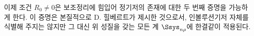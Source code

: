 
이제 조건 $R_0\ne0$은 보조정리에 힘입어 정기저의 존재에 대한 두 번째 증명을 가능하게 한다. 이 증명은 본질적으로 D. 힐베르트가 제시한 것으로서, 인볼루션기저 자체를 식별해 주지는 않지만 그 대신 위 성질을 갖는 모든 계 $\Ssys_{n\rho}$에 한결같이 적용된다.
